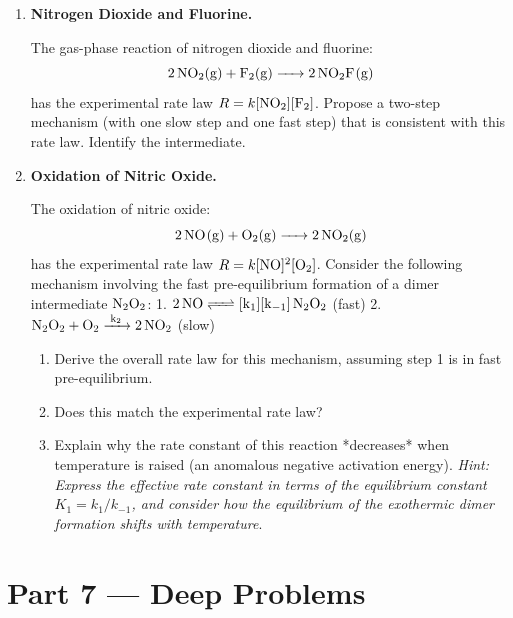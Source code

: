 \documentclass[12pt, a4paper]{book}
\begin{document}
\begin{problembox}
\begin{enumerate}[label=\textbf{P\arabic*.}]
  \item \textbf{Nitrogen Dioxide and Fluorine.}
  
        The gas-phase reaction of nitrogen dioxide and fluorine:
        \[
          \ce{2 NO2(g) + F2(g) -> 2 NO2F(g)}
        \]
        has the experimental rate law $R = k[\ce{NO2}][\ce{F2}]$.
        Propose a two-step mechanism (with one slow step and one fast step) that is consistent with this rate law. Identify the intermediate.
        
  \item \textbf{Oxidation of Nitric Oxide.}
  
        The oxidation of nitric oxide:
        \[
          \ce{2 NO(g) + O2(g) -> 2 NO2(g)}
        \]
        has the experimental rate law $R = k[\ce{NO}]^2[\ce{O2}]$.
        Consider the following mechanism involving the fast pre-equilibrium formation of a dimer intermediate $\ce{N2O2}$:
        1. $\ce{2 NO <=> [k_1][k_{-1}] N2O2}$ (fast)
        2. $\ce{N2O2 + O2 ->[k_2] 2 NO2}$ (slow)
        
        \begin{enumerate}[label=(\alph*)]
          \item Derive the overall rate law for this mechanism, assuming step 1 is in fast pre-equilibrium.
          \item Does this match the experimental rate law?
          \item Explain why the rate constant of this reaction *decreases* when temperature is raised (an anomalous negative activation energy). \textit{Hint: Express the effective rate constant in terms of the equilibrium constant $K_1 = k_1/k_{-1}$, and consider how the equilibrium of the exothermic dimer formation shifts with temperature}.
        \end{enumerate}
\end{enumerate}
\end{problembox}

\newpage

\section{Part 7 --- Deep Problems}
\end{document}
